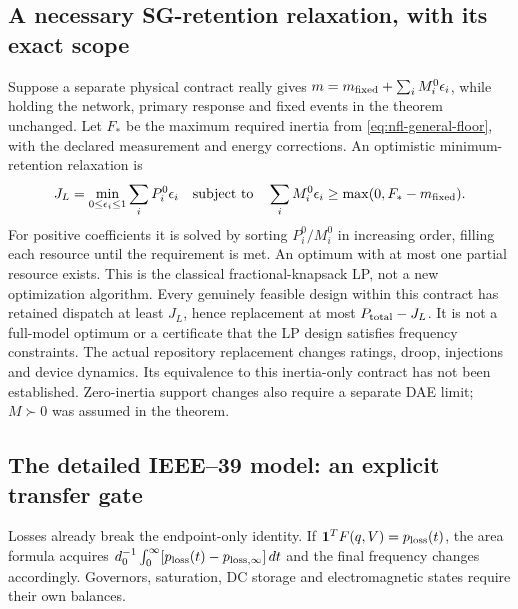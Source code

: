 \documentclass[11pt]{article}
\newcommand{\one}{\mathbf{1}}
\begin{document}
\subsection{A necessary SG-retention relaxation, with its exact scope}
Suppose a separate physical contract really gives
$m=m_{\rm fixed}+\sum_iM_i^0\epsilon_i$, while holding the network, primary
response and fixed events in the theorem unchanged. Let
$F_*$ be the maximum required inertia from
\eqref{eq:nfl-general-floor}, with the declared measurement and energy
corrections. An optimistic minimum-retention relaxation is
\begin{equation}
 J_L=\min_{0\leq\epsilon_i\leq1}\sum_i P_i^0\epsilon_i
 \quad\text{subject to}\quad
 \sum_iM_i^0\epsilon_i\geq\max(0,F_*-m_{\rm fixed}).
 \label{eq:nfl-retention-lp}
\end{equation}
For positive coefficients it is solved by sorting $P_i^0/M_i^0$ in
increasing order, filling each resource until the requirement is met.
An optimum with at most one partial resource exists. This is the classical
fractional-knapsack LP, not a new optimization algorithm.
Every genuinely feasible design within this contract has retained
dispatch at least $J_L$, hence replacement at most
$P_{\rm total}-J_L$. It is not a full-model optimum or a certificate
that the LP design satisfies frequency constraints.
The actual repository replacement changes ratings, droop, injections and
device dynamics. Its equivalence to this inertia-only contract has not
been established. Zero-inertia support changes also require a separate
DAE limit; $M\succ0$ was assumed in the theorem.

\subsection{The detailed IEEE--39 model: an explicit transfer gate}
Losses already break the endpoint-only identity. If
$\one^TF(q,V)=p_{\rm loss}(t)$, the area formula acquires
$d_0^{-1}\int_0^\infty[p_{\rm loss}(t)-p_{{\rm loss},\infty}]\,dt$
and the final frequency changes accordingly. Governors, saturation,
DC storage and electromagnetic states require their own balances.
\end{document}
